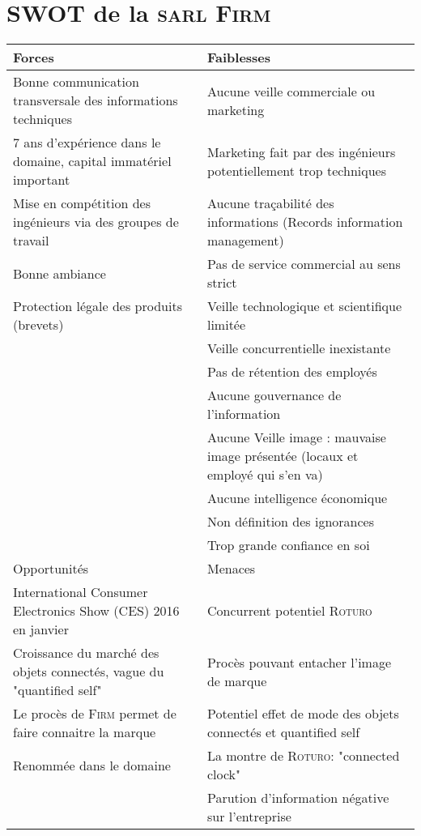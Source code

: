 \section{SWOT de la \textsc{sarl Firm}}
\begin{tabularx}{\linewidth}{|X|X|}
\hline
\hline
Forces & Faiblesses\\
\hline
\hline
Bonne communication transversale des informations techniques
& Aucune veille commerciale ou marketing \\
\hline
7 ans d'expérience dans le domaine, capital immatériel important
& Marketing fait par des ingénieurs potentiellement trop techniques\\
\hline
Mise en compétition des ingénieurs via des groupes de travail
& Aucune traçabilité des informations (Records information management)\\
\hline
Bonne ambiance
& Pas de service commercial au sens strict\\
\hline
Protection légale des produits (brevets)
& Veille technologique et scientifique limitée\\
\hline
& Veille concurrentielle inexistante\\
\hline
& Pas de rétention des employés\\
\hline
& Aucune gouvernance de l'information\\
\hline
& Aucune Veille image : mauvaise image présentée (locaux et employé qui s'en va)\\
\hline
& Aucune intelligence économique\\
\hline
& Non définition des ignorances\\
\hline
& Trop grande confiance en soi\\
\hline
\hline
Opportunités & Menaces\\
\hline
\hline
International Consumer Electronics Show (CES) 2016 en janvier
& Concurrent potentiel \textsc{Roturo}\\
\hline
Croissance du marché des objets connectés, vague du "quantified self"
& Procès pouvant entacher l'image de marque\\
\hline
Le procès de \textsc{Firm} permet de faire connaitre la marque
& Potentiel effet de mode des objets connectés et quantified self\\
\hline
Renommée dans le domaine
& La montre de \textsc{Roturo}: "connected clock"\\
\hline
& Parution d'information négative sur l'entreprise\\
\hline
\end{tabularx}

